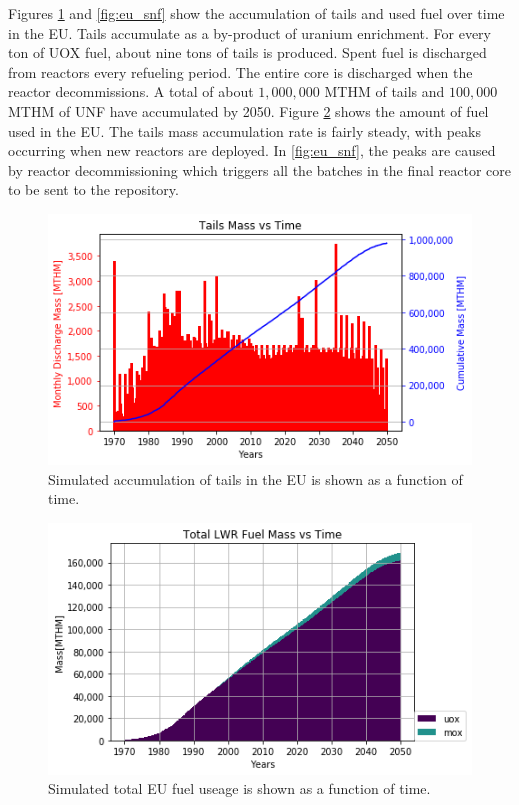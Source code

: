 Figures \ref{fig:eu_tail} and \ref{fig:eu_snf} show the 
accumulation of tails and used fuel over time in the \gls{EU}.
Tails accumulate as a by-product of uranium enrichment. For every
ton of \gls{UOX} fuel, about nine tons of tails is produced. 
Spent fuel is discharged from reactors every refueling period.
The entire core is discharged when the reactor decommissions.
A total of about $1,000,000$ MTHM of tails and $100,000$ MTHM of
\gls{UNF} have accumulated by 2050.
Figure \ref{fig:eu_fuel} shows the amount of fuel used in the \gls{EU}. The 
tails mass accumulation rate is fairly steady, with peaks occurring when new 
reactors are deployed.
In \cref{fig:eu_snf}, the peaks are caused by reactor decommissioning which 
triggers all the batches in the final reactor core to be sent to the repository.

\begin{figure}[htbp!]
	\begin{center}
		\includegraphics[scale=0.7]{./images/eu_future/tails.png}
	\end{center}
        \caption{Simulated accumulation of tails in the \gls{EU} is shown as a function of time.}
	\label{fig:eu_tail}
\end{figure}

\begin{figure}[htbp!]
	\begin{center}
		\includegraphics[scale=0.7]{./images/eu_future/total_fuel.png}
	\end{center}
\caption{Simulated total \gls{EU} fuel useage is shown as a function of time.}
	\label{fig:eu_fuel}
\end{figure}


